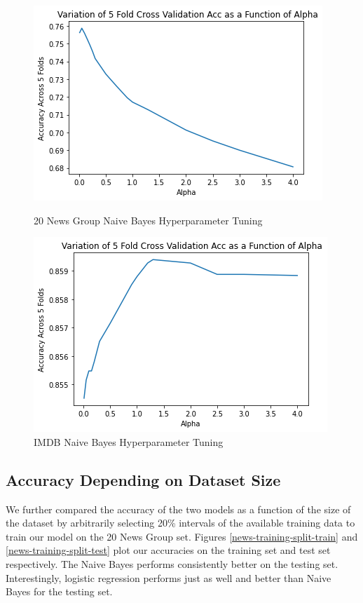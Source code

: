 \documentclass{homework}
\begin{document}
\begin{figure}[h!]
  \centering
  \begin{minipage}[h]{0.3\textwidth}
    \includegraphics[width=\textwidth]{news-nb-hyperparamater-tuning.png}
    \caption{20 News Group Naive Bayes Hyperparameter Tuning}\label{news-nb-hyperparameter-tuning}
  \end{minipage}
\hspace{1.5cm}
 \begin{minipage}[h]{0.3\textwidth}
    \includegraphics[width=\textwidth]{imdb-nb-hyperparamater-tuning.png}
    \caption{IMDB Naive Bayes Hyperparameter Tuning}\label{imdb-nb-hyperparameter-tuning}
  \end{minipage}
\end{figure}

\subsection{Accuracy Depending on Dataset Size}
We further compared the accuracy of the two models as a function of the size of the dataset by arbitrarily selecting 20\% intervals of the available training data to train our model on the 20 News Group set. Figures \ref{news-training-split-train} and \ref{news-training-split-test} plot our accuracies on the training set and test set respectively. The Naive Bayes performs consistently better on the testing set. Interestingly, logistic regression performs just as well and better than Naive Bayes for the testing set. 
\end{document}
